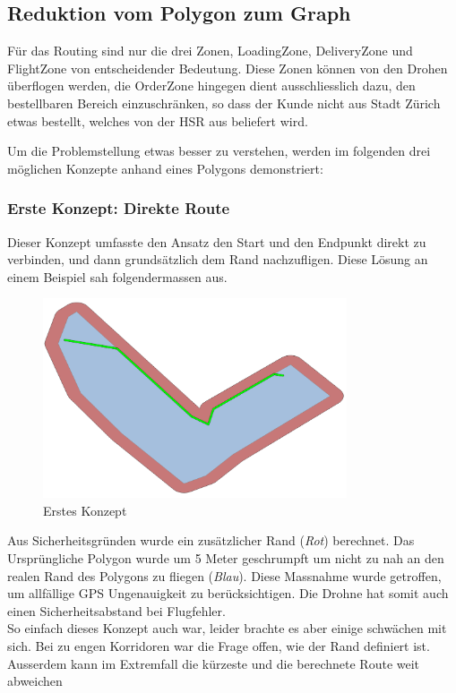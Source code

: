 \subsection{Reduktion vom Polygon zum Graph}
Für das Routing sind nur die drei Zonen, LoadingZone, DeliveryZone und FlightZone von entscheidender Bedeutung. Diese Zonen können von den Drohen überflogen werden, die OrderZone hingegen dient ausschliesslich dazu, den bestellbaren Bereich einzuschränken, so dass der Kunde nicht aus Stadt Zürich etwas bestellt, welches von der HSR aus beliefert wird.

Um die Problemstellung etwas besser zu verstehen, werden im folgenden drei möglichen Konzepte anhand eines Polygons demonstriert:

\subsubsection{Erste Konzept: Direkte Route}
Dieser Konzept umfasste den Ansatz den Start und den Endpunkt direkt zu verbinden, und dann grundsätzlich dem Rand nachzufligen. Diese Lösung an einem Beispiel sah folgendermassen aus.
\begin{figure}[h]
	\centering
	\includegraphics[width=0.8\textwidth]{images/routing/firstSolution.png}
	\caption{Erstes Konzept}
	\label{fig:first-concet-routing}
\end{figure}
Aus Sicherheitsgründen wurde ein zusätzlicher Rand (\textit{Rot}) berechnet. Das Ursprüngliche Polygon wurde um 5 Meter geschrumpft um nicht zu nah an den realen Rand des Polygons zu fliegen (\textit{Blau}). Diese Massnahme wurde getroffen, um allfällige GPS Ungenauigkeit zu berücksichtigen. Die Drohne hat somit auch einen Sicherheitsabstand bei Flugfehler.
\\
So einfach dieses Konzept auch war, leider brachte es aber einige schwächen mit sich. Bei zu engen Korridoren war die Frage offen, wie der Rand definiert ist. Ausserdem kann im Extremfall die kürzeste und die berechnete Route weit abweichen 

